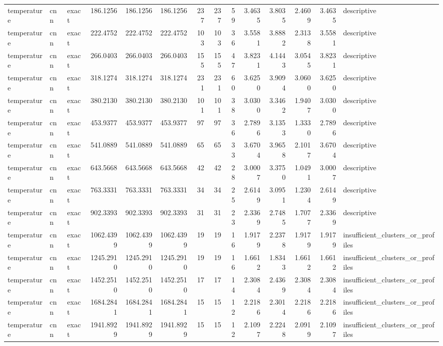 \begin{tabular}{lllrrrrrrrrrrl}
temperature & cnn & exact & 186.1256 & 186.1256 & 186.1256 & 237 & 237 & 59 & 3.4635 & 3.8035 & 2.4609 & 3.4635 & descriptive \\
temperature & cnn & exact & 222.4752 & 222.4752 & 222.4752 & 103 & 103 & 36 & 3.5581 & 3.8882 & 2.3138 & 3.5581 & descriptive \\
temperature & cnn & exact & 266.0403 & 266.0403 & 266.0403 & 155 & 155 & 47 & 3.8231 & 4.1443 & 3.0545 & 3.8231 & descriptive \\
temperature & cnn & exact & 318.1274 & 318.1274 & 318.1274 & 231 & 231 & 60 & 3.6250 & 3.9094 & 3.0600 & 3.6250 & descriptive \\
temperature & cnn & exact & 380.2130 & 380.2130 & 380.2130 & 101 & 101 & 38 & 3.0300 & 3.3462 & 1.9407 & 3.0300 & descriptive \\
temperature & cnn & exact & 453.9377 & 453.9377 & 453.9377 & 97 & 97 & 36 & 2.7896 & 3.1353 & 1.3330 & 2.7896 & descriptive \\
temperature & cnn & exact & 541.0889 & 541.0889 & 541.0889 & 65 & 65 & 33 & 3.6704 & 3.9658 & 2.1017 & 3.6704 & descriptive \\
temperature & cnn & exact & 643.5668 & 643.5668 & 643.5668 & 42 & 42 & 28 & 3.0007 & 3.3750 & 1.0491 & 3.0007 & descriptive \\
temperature & cnn & exact & 763.3331 & 763.3331 & 763.3331 & 34 & 34 & 25 & 2.6149 & 3.0951 & 1.2304 & 2.6149 & descriptive \\
temperature & cnn & exact & 902.3393 & 902.3393 & 902.3393 & 31 & 31 & 23 & 2.3369 & 2.7485 & 1.7077 & 2.3369 & descriptive \\
temperature & cnn & exact & 1062.4399 & 1062.4399 & 1062.4399 & 19 & 19 & 16 & 1.9179 & 2.2378 & 1.9179 & 1.9179 & insufficient_clusters_or_profiles \\
temperature & cnn & exact & 1245.2910 & 1245.2910 & 1245.2910 & 19 & 19 & 16 & 1.6612 & 1.8343 & 1.6612 & 1.6612 & insufficient_clusters_or_profiles \\
temperature & cnn & exact & 1452.2510 & 1452.2510 & 1452.2510 & 17 & 17 & 14 & 2.3084 & 2.4369 & 2.3084 & 2.3084 & insufficient_clusters_or_profiles \\
temperature & cnn & exact & 1684.2841 & 1684.2841 & 1684.2841 & 15 & 15 & 12 & 2.2186 & 2.3014 & 2.2186 & 2.2186 & insufficient_clusters_or_profiles \\
temperature & cnn & exact & 1941.8929 & 1941.8929 & 1941.8929 & 15 & 15 & 12 & 2.1097 & 2.2248 & 2.0919 & 2.1097 & insufficient_clusters_or_profiles \\

\end{tabular}

